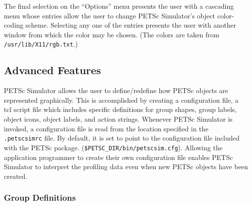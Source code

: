 The final selection on the ``Options'' menu presents the user with a cascading menu whose entries allow the user to change PETSc Simulator's object color-coding scheme.  Selecting any one of the entries presents the user with another window from which the color may be chosen.  (The colors are taken from {\tt /usr/lib/X11/rgb.txt}.)

\subsection{Advanced Features}

PETSc Simulator allows the user to define/redefine how PETSc objects are represented graphically.  This is accomplished by creating a configuration file, a tcl script file which includes specific definitions for group shapes, group labels, object icons, object labels, and action strings.  Whenever PETSc Simulator is invoked, a configuration file is read from the location specified in the {\tt .petscsimrc} file.  By default, it is set to point to the configuration file included with the PETSc package.  ({\tt \$PETSC\_DIR/bin/petscsim.cfg}).  Allowing the application programmer to create their own configuration file enables PETSc Simulator to interpret the profiling data even when new PETSc objects have been created.

\subsubsection{Group Definitions}


